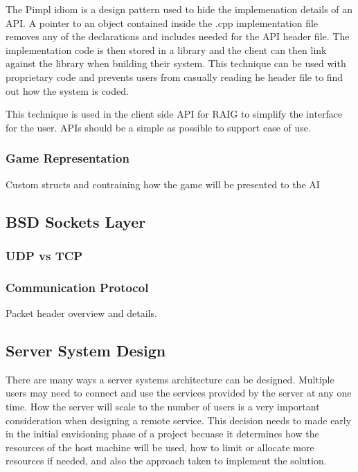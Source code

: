 \documentclass[12pt,a4paper,titlepage]{article}
\begin{document}
The Pimpl idiom is a design pattern used to hide the implemenation details of an API. A pointer to an object contained inside the .cpp implementation file removes any of the declarations and includes needed for the API header file. The implementation code is then stored in a library and the client can then link against the library when building their system. This technique can be used with proprietary code and prevents users from casually reading he header file to find out how the system is coded. 

This technique is used in the client side API for RAIG to simplify the interface for the user. APIs should be a simple as possible to support ease of use. 

\subsubsection{Game Representation}

Custom structs and contraining how the game will be presented to the AI


\subsection{BSD Sockets Layer}

\subsubsection{UDP vs TCP}

\subsubsection{Communication Protocol}

Packet header overview and details.\\

\subsection{Server System Design}

There are many ways a server systems architecture can be designed. Multiple users may need to connect and use the services provided by the server at any one time. How the server will scale to the number of users is a very important consideration when designing a remote service. This decision needs to made early in the initial envisioning phase of a project becuase it determines how the resources of the host machine will be used, how to limit or allocate more resources if needed, and also the approach taken to implement the solution.\\
\end{document}
